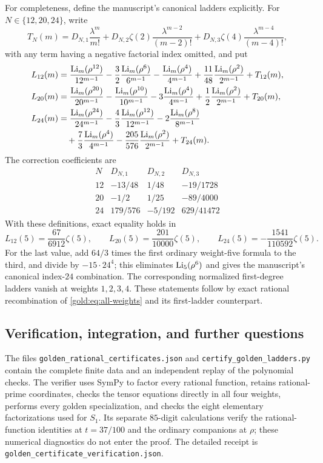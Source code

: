 For completeness, define the manuscript's canonical ladders explicitly.
For $N\in\{12,20,24\}$, write
\[
 T_N(m)=D_{N,1}\frac{\lambda^m}{m!}
       +D_{N,2}\zeta(2)\frac{\lambda^{m-2}}{(m-2)!}
       +D_{N,3}\zeta(4)\frac{\lambda^{m-4}}{(m-4)!},
\]
with any term having a negative factorial index omitted, and put
\begin{align*}
 L_{12}(m)&=\frac{\operatorname{Li}_m(\rho^{12})}{12^{m-1}}
 -\frac32\frac{\operatorname{Li}_m(\rho^6)}{6^{m-1}}
 -\frac{\operatorname{Li}_m(\rho^4)}{4^{m-1}}
 +\frac{11}{48}\frac{\operatorname{Li}_m(\rho^2)}{2^{m-1}}+T_{12}(m),\\
 L_{20}(m)&=\frac{\operatorname{Li}_m(\rho^{20})}{20^{m-1}}
 -\frac{\operatorname{Li}_m(\rho^{10})}{10^{m-1}}
 -3\frac{\operatorname{Li}_m(\rho^4)}{4^{m-1}}
 +\frac12\frac{\operatorname{Li}_m(\rho^2)}{2^{m-1}}+T_{20}(m),\\
 L_{24}(m)&=\frac{\operatorname{Li}_m(\rho^{24})}{24^{m-1}}
 -\frac43\frac{\operatorname{Li}_m(\rho^{12})}{12^{m-1}}
 -2\frac{\operatorname{Li}_m(\rho^8)}{8^{m-1}}\\
 &\quad+\frac73\frac{\operatorname{Li}_m(\rho^4)}{4^{m-1}}
 -\frac{205}{576}\frac{\operatorname{Li}_m(\rho^2)}{2^{m-1}}+T_{24}(m).
\end{align*}
The correction coefficients are
\[
\begin{array}{c|rrr}
 N&D_{N,1}&D_{N,2}&D_{N,3}\\ \hline
 12&-13/48&1/48&-19/1728\\
 20&-1/2&1/25&-89/4000\\
 24&179/576&-5/192&629/41472
\end{array}
\]
With these definitions, exact equality holds in
\[
 L_{12}(5)=\frac{67}{6912}\zeta(5),\qquad
 L_{20}(5)=\frac{201}{10000}\zeta(5),\qquad
 L_{24}(5)=-\frac{1541}{110592}\zeta(5).
\]
For the last value, add $64/3$ times the first ordinary weight-five
formula to the third, and divide by $-15\cdot24^4$; this eliminates
$\operatorname{Li}_5(\rho^6)$ and gives the manuscript's canonical index-$24$
combination.  The corresponding normalized first-degree ladders vanish
at weights $1,2,3,4$.  These statements follow by exact rational
recombination of \eqref{gold:eq:all-weights} and its first-ladder
counterpart.

\subsection{Verification, integration, and further questions}

The files \texttt{golden\_rational\_certificates.json} and
\texttt{certify\_golden\_ladders.py} contain the complete finite data and
an independent replay of the polynomial checks.  The verifier uses
SymPy to factor every rational function, retains rational-prime
coordinates, checks the tensor equations directly in all four weights,
performs every golden specialization, and checks the eight elementary
factorizations used for $S_1$.  Its separate $85$-digit calculations
verify the rational-function identities at $t=37/100$ and the ordinary
companions at $\rho$; these numerical diagnostics do not enter the proof.
The detailed receipt is
\texttt{golden\_certificate\_verification.json}.

